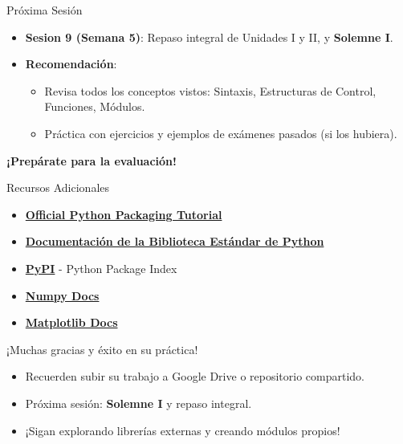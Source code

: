 \documentclass[10pt]{beamer}
\begin{document}
\begin{frame}{Próxima Sesión}
  \begin{itemize}
    \item \textbf{Sesion 9 (Semana 5)}: Repaso integral de Unidades I y II, y \textbf{Solemne I}.
    \item \textbf{Recomendación}:
      \begin{itemize}
        \item Revisa todos los conceptos vistos: Sintaxis, Estructuras de Control, Funciones, Módulos.
        \item Práctica con ejercicios y ejemplos de exámenes pasados (si los hubiera).
      \end{itemize}
  \end{itemize}
  \vspace{0.3cm}
  \textbf{¡Prepárate para la evaluación!}
\end{frame}

\begin{frame}{Recursos Adicionales}
  \begin{itemize}
    \item \href{https://packaging.python.org/tutorials/installing-packages/}{\textbf{Official Python Packaging Tutorial}}
    \item \href{https://docs.python.org/3/library/}{\textbf{Documentación de la Biblioteca Estándar de Python}}
    \item \href{https://pypi.org/}{\textbf{PyPI}} - Python Package Index
    \item \href{https://numpy.org/doc/}{\textbf{Numpy Docs}}
    \item \href{https://matplotlib.org/stable/}{\textbf{Matplotlib Docs}}
  \end{itemize}
\end{frame}

\begin{frame}
  \huge{\centerline{¡Muchas gracias y éxito en su práctica!}}
  \vspace{0.4cm}
  \normalsize
  \begin{itemize}
    \item Recuerden subir su trabajo a Google Drive o repositorio compartido.
    \item Próxima sesión: \textbf{Solemne I} y repaso integral.
    \item ¡Sigan explorando librerías externas y creando módulos propios!
  \end{itemize}
\end{frame}
\end{document}
